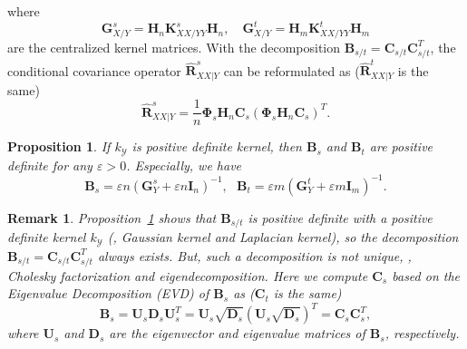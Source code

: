 \documentclass[final]{cvpr}
\newcommand{\MC}{\mathcal}
\newcommand{\MBF}{\mathbf}
\newtheorem{proposition}{Proposition}
\newtheorem{remark}{Remark}
\begin{document}
where
\begin{equation*}\label{eq:matrix-Gram-G}
\MBF{G}^{s}_{X/Y} = \MBF{H}_{n} \MBF{K}^{s}_{XX/YY} \MBF{H}_{n}, \quad \MBF{G}^{t}_{X/Y} = \MBF{H}_{m} \MBF{K}^{t}_{XX/YY} \MBF{H}_{m}
\end{equation*}
are the centralized kernel matrices. With the decomposition $\MBF{B}_{s/t}=\MBF{C}_{s/t} \MBF{C}_{s/t}^T$, the conditional covariance operator $\hat{\MBF{R}}^s_{XX|Y}$ can be reformulated as ($\hat{\MBF{R}}^t_{XX|Y}$ is the same)
\begin{equation}\label{eq:conditional-covariance_reformulation}
\hat{\MBF{R}}^s_{XX|Y}=\frac{1}{n} \MBF{\Phi}_s \MBF{H}_{n} \MBF{C}_s \left( \MBF{\Phi}_s \MBF{H}_{n} \MBF{C}_s \right)^T.
\end{equation}

\begin{proposition}\label{prop:positive-B}
If $k_{\MC{Y}}$ is positive definite kernel, then $\MBF{B}_{s}$ and $\MBF{B}_{t}$ are positive definite for any $\varepsilon>0$. Especially, we have
\begin{equation*}\label{eq:reformulated-B}
\MBF{B}_{s} = \varepsilon n \left( \MBF{G}^s_{Y} + \varepsilon n \MBF{I}_n \right)^{-1}, ~~~ \MBF{B}_{t} = \varepsilon m \left( \MBF{G}^t_{Y} + \varepsilon m \MBF{I}_m \right)^{-1}.
\end{equation*}
\end{proposition}

\begin{remark}\label{rem:empirical-estimation-CKB}
Proposition~\ref{prop:positive-B} shows that $\MBF{B}_{s/t}$ is positive definite with a positive definite kernel $k_{\MC{Y}}$ (\eg, Gaussian kernel and Laplacian kernel), so the decomposition $\MBF{B}_{s/t} = \MBF{C}_{s/t} \MBF{C}_{s/t}^T$ always exists. But, such a decomposition is not unique, \eg, Cholesky factorization and eigendecomposition. Here we compute $\MBF{C}_{s}$ based on the Eigenvalue Decomposition (EVD) of $\MBF{B}_{s}$ as ($\MBF{C}_{t}$ is the same)
\begin{equation*}\label{eq:Eigen-Matrix-B}
\MBF{B}_{s} = \MBF{U}_{s} \MBF{D}_{s} \MBF{U}_{s}^T = \MBF{U}_{s} \sqrt{\MBF{D}_{s}} \left( \MBF{U}_{s} \sqrt{\MBF{D}_{s}} \right)^T = \MBF{C}_{s}\MBF{C}_{s}^T, %
\end{equation*}
where $\MBF{U}_{s}$ and $\MBF{D}_{s}$ are the eigenvector and eigenvalue matrices of $\MBF{B}_{s}$, respectively.
\end{remark}
\end{document}
